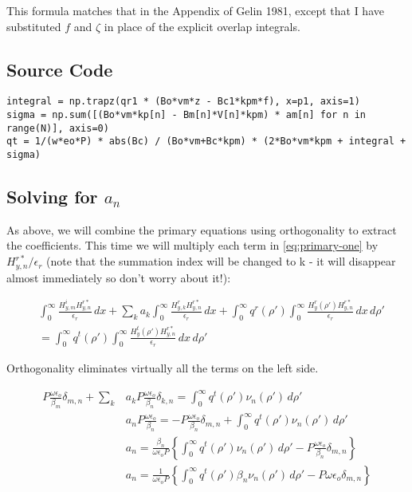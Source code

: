\documentclass[11pt, oneside]{article}   	%
\begin{document}
\noindent This formula matches that in the Appendix of Gelin 1981, except that I have substituted $f$ and $\zeta$ in place of the explicit overlap integrals.

\subsection{Source Code}

\begin{lstlisting}
integral = np.trapz(qr1 * (Bo*vm*z - Bc1*kpm*f), x=p1, axis=1)
sigma = np.sum([(Bo*vm*kp[n] - Bm[n]*V[n]*kpm) * am[n] for n in range(N)], axis=0)
qt = 1/(w*eo*P) * abs(Bc) / (Bo*vm+Bc*kpm) * (2*Bo*vm*kpm + integral + sigma)
\end{lstlisting}

\subsection{Solving for $a_{n}$}

As above, we will combine the primary equations using orthogonality to extract the coefficients. This time we will multiply each term in \eqref{eq:primary-one} by $ H_{y,n}^{r*} / \epsilon_{r}$ (note that the summation index will be changed to k - it will disappear almost immediately so don't worry about it!):

\begin{align}
&\int_{0}^{\infty} \frac{H_{y,m}^{i} H_{y,n}^{r*}}{\epsilon_{r}} \, dx
+ \sum_{k} a_{k} \int_{0}^{\infty}  \frac{H_{y,k}^{r} H_{y,n}^{r*}}{\epsilon_{r}}\, dx 
+ \int_{0}^{\infty} q^{r} (\rho ') \int_{0}^{\infty} \frac{H_{y}^{r} (\rho ') H_{y,n}^{r*}}{\epsilon_{r}} \, dx \, d\rho ' \nonumber \\
&= \int_{0}^{\infty} q^{t} (\rho ') \int_{0}^{\infty} \frac{H_{y}^{t} (\rho ') H_{y,n}^{r*}}{\epsilon_{r}} \, dx \, d\rho '
\end{align}

\noindent Orthogonality eliminates virtually all the terms on the left side.

\begin{align}
P \frac{\omega \epsilon_{o}}{\beta_{m}}\delta_{m,n} + \sum_{k} &a_{k} P \frac{\omega \epsilon_{o}}{\beta_{n}}\delta_{k,n}
= \int_{0}^{\infty} q^{t} (\rho ') \nu_{n}(\rho ') \, d\rho ' \nonumber \\
&a_{n} P \frac{\omega \epsilon_{o}}{\beta_{n}}
= -P \frac{\omega \epsilon_{o}}{\beta_{n}}\delta_{m,n} + \int_{0}^{\infty} q^{t} (\rho ') \nu_{n}(\rho ') \, d\rho ' \nonumber \\
&a_{n} = \frac{\beta_{n}}{\omega \epsilon_{o} P} \left\{\int_{0}^{\infty} q^{t} (\rho ') \nu_{n}(\rho ') \, d\rho ' -P \frac{\omega \epsilon_{o}}{\beta_{n}}\delta_{m,n} \right\} \nonumber \\
&a_{n} = \frac{1}{\omega \epsilon_{o} P} \left\{\int_{0}^{\infty} q^{t} (\rho ') \beta_{n}\nu_{n}(\rho ') \, d\rho ' -P \omega \epsilon_{o}\delta_{m,n} \right\}
\label{eq:an-tm-1}
\end{align}
\end{document}
